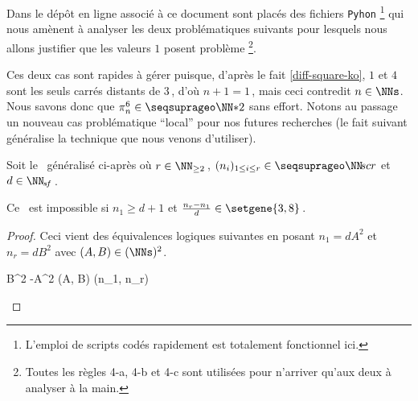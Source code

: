 Dans le dépôt en ligne associé à ce document sont placés des fichiers \verb#Pyhon#
\footnote{
	L'emploi de scripts codés rapidement est totalement fonctionnel ici.
}
qui nous amènent à analyser les deux \sftab[x] problématiques suivants pour lesquels nous allons justifier que les valeurs $1$ posent problème
\footnote{
	Toutes les règles 4-a, 4-b et 4-c sont utilisées pour n'arriver qu'aux deux \sftab[x] à analyser à la main.
}.
%
\begin{center}
\end{center}


Ces deux cas sont rapides à gérer puisque, d'après le fait \ref{diff-square-ko}, $1$ et $4$ sont les seuls carrés distants de $3$\,, d'où $n+1 = 1$\,, mais ceci contredit $n \in \NNs$. Nous savons donc que $\consprod<6> \in \NNssquare$ sans effort.
Notons au passage un nouveau cas problématique \enquote{local} pour nos futures recherches (le fait suivant généralise la technique que nous venons d'utiliser).


\newpage
\begin{fact} \label{sftable-illegal-1-sol}
	Soit le \sftab\ généralisé ci-après où
	$r \in \NN_{\geq 2}$\,,
	$( n_i )_{1 \leq i \leq r} \in \NNseq[r]$
	et
	$d \in \NNsf$\,.

    \begin{center}
    \end{center}

	Ce \sftab\ est impossible si $n_1 \geq d+1$
	et
	$\frac{n_r - n_1}{d} \in \setgene{3, 8}$\,.
\end{fact}


\begin{proof}
	Ceci vient des équivalences logiques suivantes en posant $n_1 = d A^2$ et $n_r = d B^2$ avec $(A, B) \in ( \NNs )^2$.
	
	\medskip
	\begin{stepcalc}[style=ar*, ope={\iff}]
		 \in {}
	\explnext{}
		B^2 -A^2 \in {}
		(A, B) \in {}
	\explnext{}
		(n_1, n_r) \in {}
	\end{stepcalc}

	\vspace{-2ex}	
	\leavevmode
\end{proof}


